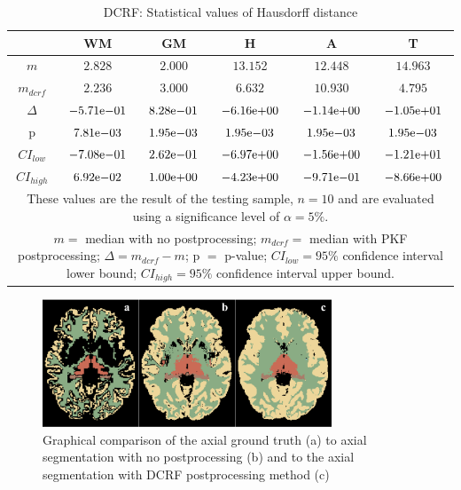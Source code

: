 \documentclass[journal]{IEEEtran}
\begin{document}
\begin{table}[h!]

\renewcommand{\arraystretch}{1.3}
\caption{DCRF: Statistical values of Hausdorff distance}
\label{tbl_dcrf_hd}
\centering
\tabcolsep=0.08cm
\begin{tabular}{c|c|c|c|c|c}
\hline
 & WM & GM & H & A & T\\
\hline
$m$&$2.828$&$2.000$&$13.15$2&$12.44$8&$14.963$\\
$m_{dcrf}$&$2.236$&$3.000$&$6.632$&$10.93$0&$4.795$\\
$\Delta$&${-5.71}\mathrm{e}{-01}$&${8.28}\mathrm{e}{-01}$&${-6.16}\mathrm{e}{+00}$&${-1.14}\mathrm{e}{+00}$&${-1.05}\mathrm{e}{+01}$\\
p&${7.81}\mathrm{e}{-03}$&${1.95}\mathrm{e}{-03}$&${1.95}\mathrm{e}{-03}$&${1.95}\mathrm{e}{-03}$&${1.95}\mathrm{e}{-03}$\\
$CI_{low}$&${-7.08}\mathrm{e}{-01}$&${2.62}\mathrm{e}{-01}$&${-6.97}\mathrm{e}{+00}$&${-1.56}\mathrm{e}{+00}$&${-1.21}\mathrm{e}{+01}$\\
$CI_{high}$	&${6.92}\mathrm{e}{-02}$&${1.00}\mathrm{e}{+00}$&${-4.23}\mathrm{e}{+00}$&${-9.71}\mathrm{e}{-01}$&${-8.66}\mathrm{e}{+00}$\\
\hline
\multicolumn{6}{p{3.4in}}{These values are the result of the testing sample, $n=10$ and are evaluated using a significance level of $\alpha = 5\%$. }\\
\multicolumn{6}{p{3.4in}}{$m=$ median with no postprocessing; $m_{dcrf}=$ median with PKF postprocessing; $\Delta=m_{dcrf}-m$; p $=$ p-value;  $CI_{low}= 95\%$ confidence interval lower bound; $CI_{high}= 95\%$ confidence interval upper bound.}\\

\end{tabular}

\end{table}

\begin{figure}[ht]
\centering

\includegraphics[width=3.4in]{img/boxplots/DCRF.png}
\caption{Graphical comparison of the axial ground truth (a) to axial segmentation with no postprocessing (b) and to the axial segmentation with DCRF postprocessing method (c) }
\label{fig_dcrf}
\end{figure}
\end{document}
